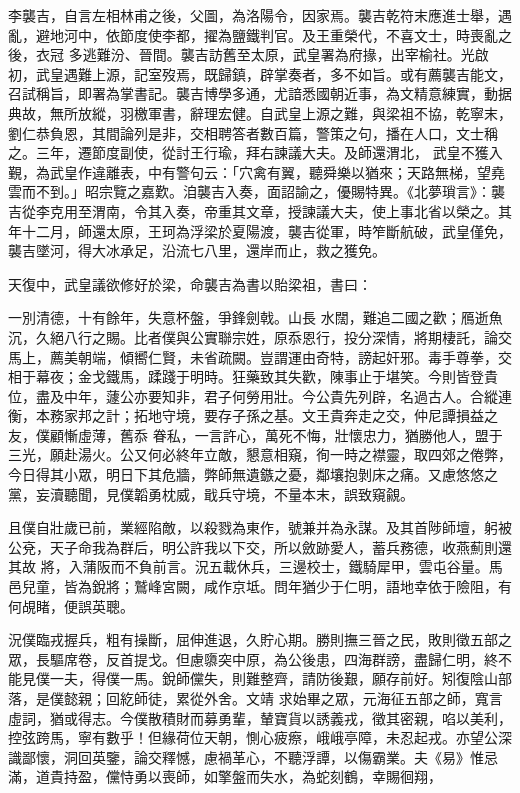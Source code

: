 
\begin{pinyinscope}

 李襲吉，自言左相林甫之後，父圖，為洛陽令，因家焉。襲吉乾符末應進士舉，遇亂，避地河中，依節度使李都，擢為鹽鐵判官。及王重榮代，不喜文士，時喪亂之後，衣冠
 多逃難汾、晉間。襲吉訪舊至太原，武皇署為府掾，出宰榆社。光啟初，武皇遇難上源，記室歿焉，既歸鎮，辟掌奏者，多不如旨。或有薦襲吉能文，召試稱旨，即署為掌書記。襲吉博學多通，尤諳悉國朝近事，為文精意練實，動据典故，無所放縱，羽檄軍書，辭理宏健。自武皇上源之難，與梁祖不協，乾寧末，劉仁恭負恩，其間論列是非，交相聘答者數百篇，警策之句，播在人口，文士稱之。三年，遷節度副使，從討王行瑜，拜右諫議大夫。及師還渭北，
 武皇不獲入覲，為武皇作違離表，中有警句云：「穴禽有翼，聽舜樂以猶來；天路無梯，望堯雲而不到。」昭宗覽之嘉歎。洎襲吉入奏，面詔諭之，優賜特異。《北夢瑣言》：襲吉從李克用至渭南，令其入奏，帝重其文章，授諫議大夫，使上事北省以榮之。其年十二月，師還太原，王珂為浮梁於夏陽渡，襲吉從軍，時笮斷航破，武皇僅免，襲吉墜河，得大冰承足，沿流七八里，還岸而止，救之獲免。



 天復中，武皇議欲修好於梁，命襲吉為書以貽梁祖，書曰：



 一別清德，十有餘年，失意杯盤，爭鋒劍戟。山長
 水闊，難追二國之歡；鴈逝魚沉，久絕八行之賜。比者僕與公實聯宗姓，原忝恩行，投分深情，將期棲託，論交馬上，薦美朝端，傾嚮仁賢，未省疏闕。豈謂運由奇特，謗起奸邪。毒手尊拳，交相于幕夜；金戈鐵馬，蹂踐于明時。狂藥致其失歡，陳事止于堪笑。今則皆登貴位，盡及中年，蘧公亦要知非，君子何勞用壯。今公貴先列辟，名過古人。合縱連衡，本務家邦之計；拓地守境，要存子孫之基。文王貴奔走之交，仲尼譚損益之友，僕顧慚虛薄，舊忝
 眷私，一言許心，萬死不悔，壯懷忠力，猶勝他人，盟于三光，願赴湯火。公又何必終年立敵，懇意相窺，徇一時之襟靈，取四郊之倦弊，今日得其小眾，明日下其危牆，弊師無遺鏃之憂，鄰壤抱剝床之痛。又慮悠悠之黨，妄瀆聽聞，見僕韜勇枕威，戢兵守境，不量本末，誤致窺覦。



 且僕自壯歲已前，業經陷敵，以殺戮為東作，號兼并為永謀。及其首陟師壇，躬被公兗，天子命我為群后，明公許我以下交，所以斂跡愛人，蓄兵務德，收燕薊則還其故
 將，入蒲阪而不負前言。況五載休兵，三邊校士，鐵騎犀甲，雲屯谷量。馬邑兒童，皆為銳將；鷲峰宮闕，咸作京坻。問年猶少于仁明，語地幸依于險阻，有何覘睹，便誤英聰。



 況僕臨戎握兵，粗有操斷，屈伸進退，久貯心期。勝則撫三晉之民，敗則徵五部之眾，長驅席卷，反首提戈。但慮隳突中原，為公後患，四海群謗，盡歸仁明，終不能見僕一夫，得僕一馬。銳師儻失，則難整齊，請防後艱，願存前好。矧復陰山部落，是僕懿親；回紇師徒，累從外舍。文靖
 求始畢之眾，元海征五部之師，寬言虛詞，猶或得志。今僕散積財而募勇輩，輦寶貨以誘義戎，徵其密親，啗以美利，控弦跨馬，寧有數乎！但緣荷位天朝，惻心疲瘵，峨峨亭障，未忍起戎。亦望公深識鄙懷，洞回英鑒，論交釋憾，慮禍革心，不聽浮譚，以傷霸業。夫《易》惟忌滿，道貴持盈，儻恃勇以喪師，如擎盤而失水，為蛇刻鶴，幸賜徊翔，




\end{pinyinscope}
